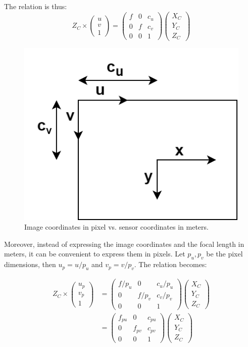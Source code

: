 The relation is thus:
\begin{equation}
    Z_C \times \begin{pmatrix}u\\v\\1\end{pmatrix} = \begin{pmatrix}f & 0 &c_u \\0 & f & c_v\\0&0&1\end{pmatrix}\begin{pmatrix}X_C\\Y_C\\Z_C\end{pmatrix}
\end{equation}

\begin{figure}[hbtp]
	\centering
	\def\svgwidth{\columnwidth}
	\fontsize{10pt}{10pt}\selectfont
	\includegraphics[width=0.3\linewidth]{"../Chap2/Figures/Image_Coord.png"}
	\caption{Image coordinates in pixel vs. sensor coordinates in meters.} 
	\label{fig_imagecoord}
\end{figure}

Moreover, instead of expressing the image coordinates and the focal length in meters, it can be convenient to express them in pixels. Let \(p_u, p_v\) be the pixel dimensions, then \(u_p = u/p_u\) and \(v_p = v/p_v\). The relation becomes:

\begin{equation}
  \begin{split}
  Z_C \times \begin{pmatrix}u_p\\v_p\\1\end{pmatrix} 
  &= \begin{pmatrix}f/p_u & 0 &c_u/p_u \\0 & f/p_v & c_v/p_v\\0&0&1\end{pmatrix}\begin{pmatrix}X_C\\Y_C\\Z_C\end{pmatrix}\\
  &= \begin{pmatrix}f_{pu} & 0 & c_{pu} \\0 & f_{pv} & c_{pv} \\ 0&0&1\end{pmatrix}\begin{pmatrix}X_C\\Y_C\\Z_C\end{pmatrix}
  \end{split}
\end{equation}


